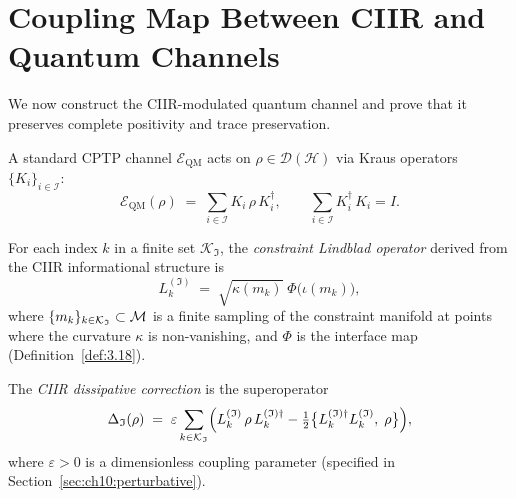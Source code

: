 \section{Coupling Map Between CIIR and Quantum Channels}
\label{sec:ch10:channel_coupling}

We now construct the CIIR-modulated quantum channel and prove that it
preserves complete positivity and trace preservation.

\begin{definition}
\label{def:10.6}
A standard CPTP channel $\mathcal{E}_{\mathrm{QM}}$ acts on
$\rho\in\mathcal{D}(\mathcal{H})$ via Kraus operators
$\{K_i\}_{i\in\mathcal{I}}$:
\begin{equation}
\label{eq:10.cptp}
  \mathcal{E}_{\mathrm{QM}}(\rho)
  \;=\;
  \sum_{i\in\mathcal{I}} K_i\,\rho\,K_i^{\dagger},
  \qquad
  \sum_{i\in\mathcal{I}} K_i^{\dagger}\,K_i = I.
\end{equation}
\end{definition}

\begin{definition}
\label{def:10.7}
For each index $k$ in a finite set $\mathcal{K}_{\mathfrak{I}}$,
the \emph{constraint Lindblad operator} derived from the CIIR
informational structure is
\begin{equation}
\label{eq:10.constraint_lindblad}
  L_k^{(\mathfrak{I})}
  \;=\;
  \sqrt{\kappa(m_k)}\;
  \Phi\bigl(\iota(m_k)\bigr),
\end{equation}
where $\{m_k\}_{k\in\mathcal{K}_{\mathfrak{I}}}\subset\mathcal{M}$ is a
finite sampling of the constraint manifold at points where the
curvature $\kappa$ is non-vanishing, and $\Phi$ is the interface map
(Definition~\ref{def:3.18}).
\end{definition}

\begin{definition}
\label{def:10.8}
The \emph{CIIR dissipative correction} is the superoperator
\begin{equation}
\label{eq:10.delta_I}
  \Delta_{\mathfrak{I}}(\rho)
  \;=\;
  \varepsilon
  \sum_{k\in\mathcal{K}_{\mathfrak{I}}}
  \Bigl(
    L_k^{(\mathfrak{I})}\,\rho\,L_k^{(\mathfrak{I})\dagger}
    -
    \tfrac{1}{2}
    \bigl\{
      L_k^{(\mathfrak{I})\dagger}L_k^{(\mathfrak{I})},\;\rho
    \bigr\}
  \Bigr),
\end{equation}
where $\varepsilon>0$ is a dimensionless coupling parameter
(specified in Section~\ref{sec:ch10:perturbative}).
\end{definition}

